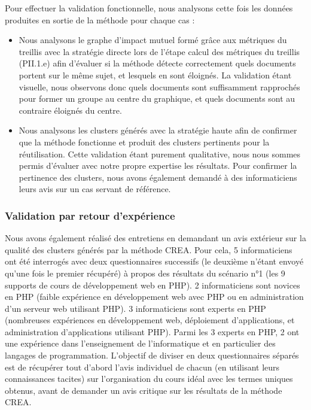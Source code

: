 Pour effectuer la validation fonctionnelle, nous analysons cette fois les données produites en sortie de la méthode pour chaque cas :
\begin{itemize}
\item Nous analysons le graphe d'impact mutuel formé grâce aux métriques du treillis avec la stratégie directe lors de l'étape calcul des métriques du treillis (PII.1.e) afin d'évaluer si la méthode détecte correctement quels documents portent sur le même sujet, et lesquels en sont éloignés.
La validation étant visuelle, nous observons donc quels documents sont suffisamment rapprochés pour former un groupe au centre du graphique, et quels documents sont au contraire éloignés du centre.\\

\item Nous analysons les clusters générés avec la stratégie haute afin de confirmer que la méthode fonctionne et produit des clusters pertinents pour la réutilisation.
Cette validation étant purement qualitative, nous nous sommes permis d'évaluer avec notre propre expertise les résultats.
Pour confirmer la pertinence des clusters, nous avons également demandé à des informaticiens leurs avis sur un cas servant de référence.
\end{itemize}




\subsubsection{Validation par retour d'expérience}
\label{subsubsection:Evaluation:ProtocoleEvaluation:ValidationsStructurellesFonctionnellesREX:REX}


Nous avons également réalisé des entretiens en demandant un avis extérieur sur la qualité des clusters générés par la méthode CREA.
Pour cela, 5 informaticiens ont été interrogés avec deux questionnaires successifs (le deuxième n'étant envoyé qu'une fois le premier récupéré) à propos des résultats du scénario n°1 (les 9 supports de cours de développement web en PHP).
2 informaticiens sont novices en PHP (faible expérience en développement web avec PHP ou en administration d'un serveur web utilisant PHP).
3 informaticiens sont experts en PHP (nombreuses expériences en développement web, déploiement d'applications, et administration d'applications utilisant PHP).
Parmi les 3 experts en PHP, 2 ont une expérience dans l'enseignement de l'informatique et en particulier des langages de programmation.
L'objectif de diviser en deux questionnaires séparés est de récupérer tout d'abord l'avis individuel de chacun (en utilisant leurs connaissances tacites) sur l'organisation du cours idéal avec les termes uniques obtenus, avant de demander un avis critique sur les résultats de la méthode CREA.

